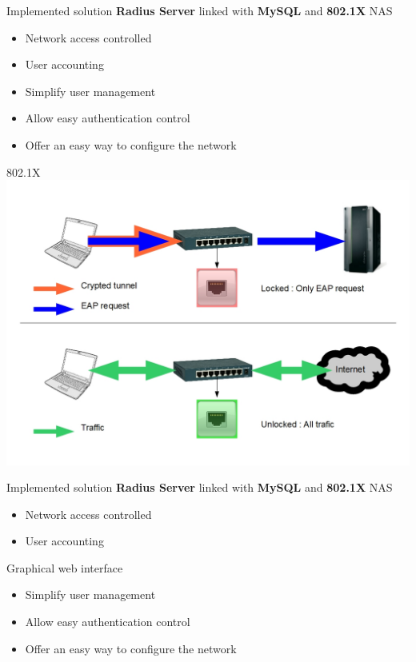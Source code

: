 \documentclass[12pt]{beamer}
\begin{document}
\begin{frame}{Implemented solution}
    \textbf{Radius Server} linked with \textbf{MySQL} and \textbf{802.1X} NAS
    \begin{itemize}
	\item<1-2> Network access controlled
	\item<2> User accounting
    \end{itemize}
    \vfill
    \begin{itemize}
	\item<0> Simplify user management
	\item<0> Allow easy authentication control
	\item<0> Offer an easy way to configure the network
    \end{itemize}
    \vfill
\end{frame}
	
\begin{frame}{802.1X}
    \includegraphics[width=300pts]{img/dot1x.jpg}
\end{frame}

\begin{frame}{Implemented solution}
    \textbf{Radius Server} linked with \textbf{MySQL} and \textbf{802.1X} NAS
    \begin{itemize}
	\item Network access controlled
	\item User accounting
    \end{itemize}
    \vfill
    Graphical web interface
    \begin{itemize}
	\item<1-> Simplify user management
	\item<2-> Allow easy authentication control
	\item<3-> Offer an easy way to configure the network
    \end{itemize}
    \vfill
\end{frame}
\end{document}
